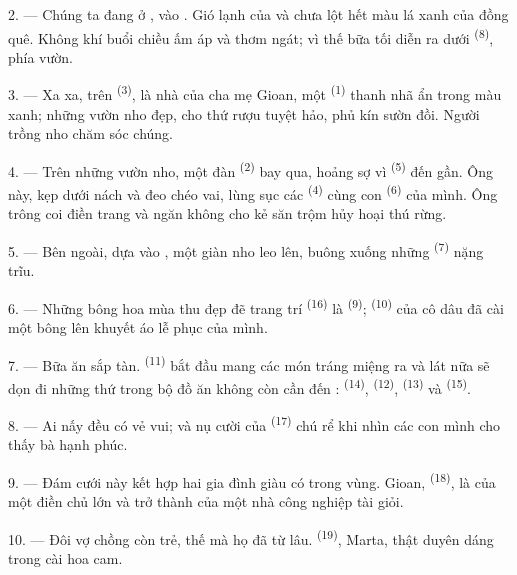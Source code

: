 2. --- Chúng ta đang ở , vào . Gió lạnh của
 và  chưa lột hết màu lá xanh của đồng quê.
Không khí buổi chiều ấm áp và thơm ngát; vì thế bữa tối diễn ra dưới 
\textsuperscript{(8)}, phía vườn.

3. --- Xa xa, trên  \textsuperscript{(3)}, là nhà của cha mẹ Gioan, một
 \textsuperscript{(1)} thanh nhã ẩn trong màu xanh; những vườn nho
đẹp, cho thứ rượu tuyệt hảo, phủ kín sườn đồi. Người trồng nho chăm sóc chúng.

4. --- Trên những vườn nho, một đàn  \textsuperscript{(2)} bay qua, hoảng
sợ vì  \textsuperscript{(5)} đến gần. Ông này,  kẹp
dưới nách và  đeo chéo vai, lùng sục các 
\textsuperscript{(4)} cùng con  \textsuperscript{(6)} của mình. Ông trông coi
điền trang và ngăn không cho kẻ săn trộm hủy hoại thú rừng.

5. --- Bên ngoài, dựa vào , một giàn nho leo lên, buông xuống những
 \textsuperscript{(7)} nặng trĩu.

6. --- Những bông hoa mùa thu đẹp đẽ trang trí  \textsuperscript{(16)}
là  \textsuperscript{(9)};  \textsuperscript{(10)} của cô dâu
đã cài một bông lên khuyết áo lễ phục của mình.

7. --- Bữa ăn sắp tàn.  \textsuperscript{(11)} bắt đầu mang các
món tráng miệng ra và lát nữa sẽ dọn đi những thứ trong bộ đồ ăn không còn cần đến :
 \textsuperscript{(14)},  \textsuperscript{(12)},
 \textsuperscript{(13)} và  \textsuperscript{(15)}.

\VUsaut{3.0mm}

8. --- Ai nấy đều có vẻ vui; và nụ cười của  \textsuperscript{(17)} chú rể
khi nhìn các con mình cho thấy bà hạnh phúc.

9. --- Đám cưới này kết hợp hai gia đình giàu có trong vùng. Gioan, 
\textsuperscript{(18)}, là  của một điền chủ lớn và trở thành
 của một nhà công nghiệp tài giỏi.

10. --- Đôi vợ chồng còn trẻ, thế mà họ đã  từ lâu. 
\textsuperscript{(19)}, Marta, thật duyên dáng trong  cài hoa cam.


